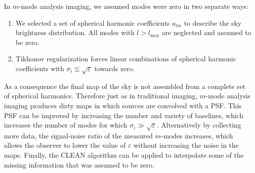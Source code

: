 \documentclass[twocolumn]{aastex61}
\begin{document}
In $m$-mode analysis imaging, we assumed modes were zero in two separate ways:
\begin{enumerate}
    \item We selected a set of spherical harmonic coefficients $a_{lm}$ to describe the sky
        brightness distribution. All modes with $l>l_\text{max}$ are neglected and assumed to be
        zero.
    \item Tikhonov regularization forces linear combinations of spherical harmonic coefficients with
        $\sigma_i \lesssim \sqrt{\varepsilon}$ towards zero.
\end{enumerate}
As a consequence the final map of the sky is not assembled from a complete set of spherical
harmonics. Therefore just as in traditional imaging, $m$-mode analysis imaging produces dirty maps
in which sources are convolved with a PSF.  This PSF can be improved by increasing the number and
variety of baselines, which increases the number of modes for which $\sigma_i \gg
\sqrt{\varepsilon}$.  Alternatively by collecting more data, the signal-noise ratio of the measured
$m$-modes increases, which allows the observer to lower the value of $\varepsilon$ without
increasing the noise in the maps.  Finally, the CLEAN algorithm can be applied to interpolate some
of the missing information that was assumed to be zero.
\end{document}
